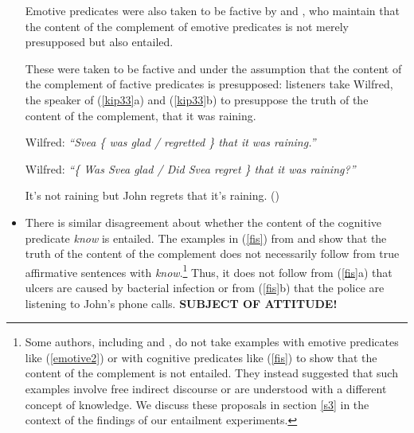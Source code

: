 \documentclass[11pt,fleqn]{article}
\def\infelic{{\leavevmode\llap{\#}}}
\newcommand{\6}{\mbox{$[\hspace*{-.6mm}[$}}
\newcommand{\9}{\mbox{$]\hspace*{-.6mm}]$}}
\begin{document}
\begin{itemize}
\begin{exe}
\begin{xlist}
\end{xlist}

\end{exe}


Emotive predicates were also taken to be factive by \citealt{gazdar79a,abrusan2011} and \citealt{anand-hacquard2014}, who maintain that the content of the complement of emotive predicates is not merely presupposed but also entailed. 

These were taken to be factive \citealt{kiparsky-kiparsky70} and \citealt{karttunen71-implicative,karttunen71b} under the assumption that the content of the complement of factive predicates is presupposed: listeners take Wilfred, the speaker of (\ref{kip33}a) and (\ref{kip33}b) to presuppose the truth of the content of the complement, that it was raining.  

\begin{exe}
\ex\label{kip33}
\begin{xlist}
\ex Wilfred: {\em ``Svea \{ was glad / regretted \} that it was raining.''}

\ex Wilfred: {\em ``\{ Was Svea glad / Did Svea regret \} that it was raining?''}

\ex \infelic It's not raining but John regrets that it's raining.  \hfill (\citealt[514]{abrusan2011})


\end{xlist}
\end{exe}

\item There is similar disagreement about whether the content of the cognitive predicate {\em know} is entailed. The examples in (\ref{fis}) from  \citealt{hazlett2010} and \citealt{abrusan2011} show that the truth of the content of the complement does not necessarily follow from true affirmative sentences with {\em know}.\footnote{Some authors, including \citet{gazdar79a} and \citet{abrusan2011}, do not take examples with emotive predicates like (\ref{emotive2}) or with cognitive predicates like (\ref{fis}) to show that the content of the complement is not entailed. They instead suggested that such examples involve free indirect discourse or are understood with a different concept of knowledge. We discuss these proposals in section \ref{s3} in the context of the findings of our entailment experiments.} Thus, it does not follow from (\ref{fis}a) that ulcers are caused by bacterial infection or from (\ref{fis}b) that the police are listening to John's phone calls. {\bf SUBJECT OF ATTITUDE!}

\begin{exe}
\ex\label{fis}
\begin{xlist}


\end{xlist}
\end{exe}
\end{itemize}
\end{document}
